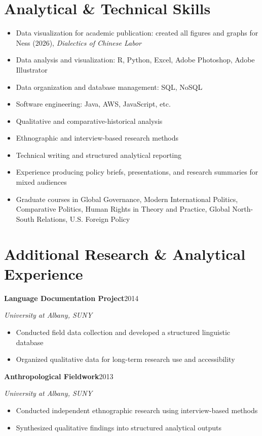 \documentclass[11pt,letterpaper]{article}
\newcommand{\entry}[3]{%
  \par{\bfseries #1}\hfill #2\par\nopagebreak
  {\itshape #3}\par\nopagebreak
}
\newcommand{\gap}{\par\vspace{7pt}}
\begin{document}
\section*{Analytical \& Technical Skills}

\begin{itemize}
  \item Data visualization for academic publication: created all figures and graphs for Ness (2026), \textit{Dialectics of Chinese Labor}
  \item Data analysis and visualization: R, Python, Excel, Adobe Photoshop, Adobe Illustrator
  \item Data organization and database management: SQL, NoSQL
  \item Software engineering: Java, AWS, JavaScript, etc.
  \item Qualitative and comparative-historical analysis
  \item Ethnographic and interview-based research methods
  \item Technical writing and structured analytical reporting
  \item Experience producing policy briefs, presentations, and research summaries for mixed audiences
  \item Graduate courses in Global Governance, Modern International Politics, Comparative Politics, Human Rights in Theory and Practice, Global North-South Relations, U.S. Foreign Policy
\end{itemize}

\section*{Additional Research \& Analytical Experience}

\entry{Language Documentation Project}{2014}{University at Albany, SUNY}
\begin{itemize}
  \item Conducted field data collection and developed a structured linguistic database
  \item Organized qualitative data for long-term research use and accessibility
\end{itemize}
\gap
\entry{Anthropological Fieldwork}{2013}{University at Albany, SUNY}
\begin{itemize}
  \item Conducted independent ethnographic research using interview-based methods
  \item Synthesized qualitative findings into structured analytical outputs
\end{itemize}
\end{document}
